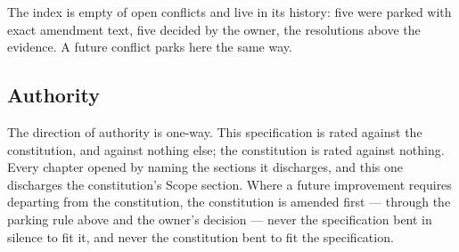 \noindent The index is empty of open conflicts and live in its history: five were parked with
exact amendment text, five decided by the owner, the resolutions above the evidence. A future
conflict parks here the same way.

\subsection{Authority}

The direction of authority is one-way. This specification is rated against the
constitution, and against nothing else; the constitution is rated against nothing. Every
chapter opened by naming the sections it discharges, and this one discharges the
constitution's Scope section. Where a future improvement requires departing from the
constitution, the constitution is amended first --- through the parking rule above and the
owner's decision --- never the specification bent in silence to fit it, and never the
constitution bent to fit the specification.
